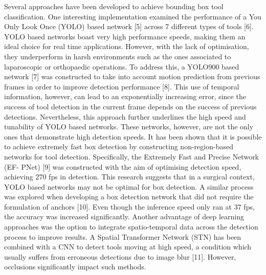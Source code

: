 Several approaches have been developed to achieve bounding box tool classification. One interesting implementation examined the performance of a You Only Look Once (YOLO) based network [5] across 7 different types of tools [6]. YOLO based networks boast very high performance speeds, making them an ideal choice for real time applications. However, with the lack of optimisation, they underperform in harsh environments such as the ones associated to laparoscopic or orthopaedic operations. To address this, a YOLO900 based network [7] was constructed to take into account motion prediction from previous frames in order to improve detection performance [8]. This use of temporal information, however, can lead to an exponentially increasing error, since the success of tool detection in the current frame depends on the success of previous detections. Nevertheless, this approach further underlines the high speed and tunability of YOLO based networks. These networks, however, are not the only ones that demonstrate high detection speeds. It has been shown that it is possible to achieve extremely fast box detection by constructing non-region-based networks for tool detection. Specifically, the Extremely Fast and Precise Network (EF- PNet) [9] was constructed with the aim of optimising detection speed, achieving 270 fps in detection. This research suggests that in a surgical context, YOLO based networks may not be optimal for box detection. A similar process was explored when developing a box detection network that did not require the formulation of anchors [10]. Even though the inference speed only ran at 37 fps, the accuracy was increased significantly. Another advantage of deep learning approaches was the option to integrate spatio-temporal data across the detection process to improve results. A Spatial Transformer Network (STN) has been combined with a CNN to detect tools moving at high speed, a condition which usually suffers from erroneous detections due to image blur [11]. However, occlusions significantly impact such methods.


